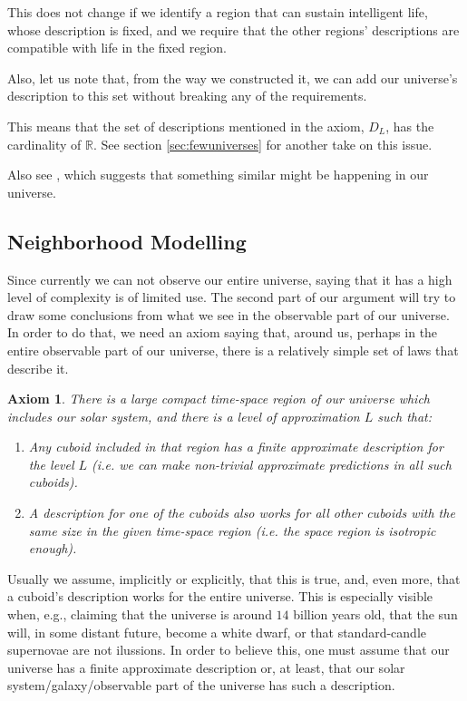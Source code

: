 \documentclass[a4paper
,draft
]{article}
\def\reale{\mathbb{R}}
\def\descriptions{D_L}
\newtheorem{axiom}{Axiom}
\begin{document}
This does not change if we identify a region that can sustain intelligent life,
whose description is fixed,
and we require that the other regions' descriptions are compatible with life
in the fixed region.

Also, let us note that, from the way we constructed it, we can add our
universe's description to this set without breaking any of the requirements.

This means that the set of descriptions mentioned in the axiom,
$\descriptions$, has the cardinality of $\reale$. See section
\ref{sec:fewuniverses} for another take on this issue.

Also see \parencite{Manson2003}, which suggests that something similar
might be happening in our universe.

\subsection{Neighborhood Modelling}

Since currently we can not observe our entire universe, saying that it has a
high level of complexity is of limited use.
The second part of our argument will try to draw some conclusions from
what we see in the observable part of our universe.
In order to do that, we need an axiom saying that, around us, perhaps in the
entire observable part of our universe, there is a relatively simple
set of laws that describe it.

\begin{axiom}\label{ax:finiteneighborhood}
  There is a large compact time-space region of our universe which
  includes our solar
  system, and there is a level of approximation $L$ such that:
  \begin{enumerate}
    \item Any cuboid included in that region has a finite approximate
          description for the level $L$ (i.e. we can make non-trivial
          approximate predictions in all such cuboids).
    \item A description for one of the cuboids also works for all other
          cuboids with the same size in the given time-space region
          (i.e. the space region is isotropic enough).
  \end{enumerate}
\end{axiom}

Usually we assume, implicitly or explicitly,
that this is true, and, even more, that a cuboid's description works
for the entire universe.
This is especially visible when, e.g., claiming
that the universe is around $14$ billion years old, that the sun will,
in some distant future, become a white dwarf, or that standard-candle supernovae
are not ilussions.
In order to believe this, one must assume that our universe has a
finite approximate description or, at least, that our
solar system/galaxy/observable part of the universe has such a description.
\end{document}
